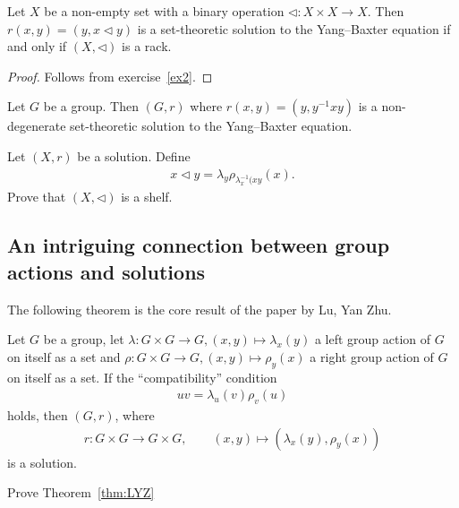     \begin{proposition}\label{prop:rack}
        Let $X$ be a non-empty set with a binary operation $\triangleleft: X\times X \to X$. Then $r(x,y) =(y,x\triangleleft y)$ is a set-theoretic solution to the Yang--Baxter equation if and only if $(X,\triangleleft)$ is a rack. 
    \end{proposition}

    \begin{proof}
        Follows from exercise~\ref{ex2}.
    \end{proof}

    \begin{exercise}
         Let $G$ be a group. Then $(G,r)$ where $r(x,y)=(y, y^{-1}xy)$ is a 
         non-degenerate set-theoretic solution to the Yang--Baxter equation.
    \end{exercise}

\begin{exercise}
    Let $(X,r)$ be a solution. Define 
    \begin{align*}
        x\triangleleft y = \lambda_y\rho_{\lambda_x^{-1}(xy}(x).
    \end{align*}
    Prove that $(X,\triangleleft)$ is a shelf.
\end{exercise}


\subsection{An intriguing connection between group actions and solutions}
    The following theorem is the core result of the paper \cite{LYZ00} by Lu, Yan Zhu.

    \begin{theorem}\label{thm:LYZ}
         Let $G$ be a group, let $\lambda: G\times G \to G, (x,y)\mapsto \lambda_x(y)$ a left group action of $G$ on itself as a set and $\rho: G\times G \to G, (x,y)\mapsto \rho_y(x)$ a right group action of $G$ on itself as a set. If the ``compatibility'' condition 
        \begin{align}\label{eq:LYZ}
            uv = \lambda_u(v)\rho_v(u)
        \end{align}
        holds, then $(G,r)$, where
        \begin{align*}
            r:G\times G \to G\times G, \qquad (x,y)\mapsto (\lambda_x(y),\rho_y(x))
        \end{align*}
        is a solution.
    \end{theorem}

    \begin{exercise}\label{ex:LYZ}
        Prove Theorem~\ref{thm:LYZ}
    \end{exercise}

